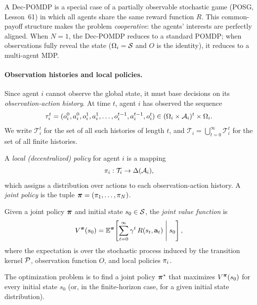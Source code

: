 \documentclass[11pt,a4paper]{article}
\begin{document}
\begin{remark}
\label{rem:decpomdp-vs-sg}
A Dec-POMDP is a special case of a partially observable stochastic
game (POSG, Lesson~61) in which all agents share the same reward
function $R$.  This common-payoff structure makes the problem
\emph{cooperative}: the agents' interests are perfectly aligned.
When $N = 1$, the Dec-POMDP reduces to a standard POMDP; when
observations fully reveal the state ($\Omega_i = \mathcal{S}$ and
$O$ is the identity), it reduces to a multi-agent MDP.
\end{remark}

\paragraph{Observation histories and local policies.}
Since agent $i$ cannot observe the global state, it must base
decisions on its \emph{observation-action history}.  At time $t$,
agent $i$ has observed the sequence
\[
  \tau_i^t = (o_i^0, a_i^0, o_i^1, a_i^1, \ldots, o_i^{t-1},
  a_i^{t-1}, o_i^t) \in (\Omega_i \times \mathcal{A}_i)^t \times \Omega_i.
\]
We write $\mathcal{T}_i^t$ for the set of all such histories of
length $t$, and $\mathcal{T}_i = \bigcup_{t=0}^{\infty} \mathcal{T}_i^t$
for the set of all finite histories.

\begin{definition}
\label{def:local-joint-policy}
A \emph{local (decentralized) policy} for agent $i$ is a mapping
\[
  \pi_i : \mathcal{T}_i \to \Delta(\mathcal{A}_i),
\]
which assigns a distribution over actions to each observation-action
history.  A \emph{joint policy} is the tuple
$\boldsymbol{\pi} = (\pi_1, \ldots, \pi_N)$.
\end{definition}

\begin{definition}
\label{def:joint-value}
Given a joint policy $\boldsymbol{\pi}$ and initial state $s_0 \in \mathcal{S}$,
the \emph{joint value function} is
\[
  V^{\boldsymbol{\pi}}(s_0) = \mathbb{E}^{\boldsymbol{\pi}}\!\left[
    \sum_{t=0}^{\infty} \gamma^t\, R(s_t, \mathbf{a}_t)
    \;\middle|\; s_0
  \right],
\]
where the expectation is over the stochastic process induced by
the transition kernel $\mathcal{P}$, observation function $O$, and
local policies $\pi_i$.
\end{definition}

The optimization problem is to find a joint policy $\boldsymbol{\pi}^*$
that maximizes $V^{\boldsymbol{\pi}}(s_0)$ for every initial state $s_0$
(or, in the finite-horizon case, for a given initial state
distribution).
\end{document}
